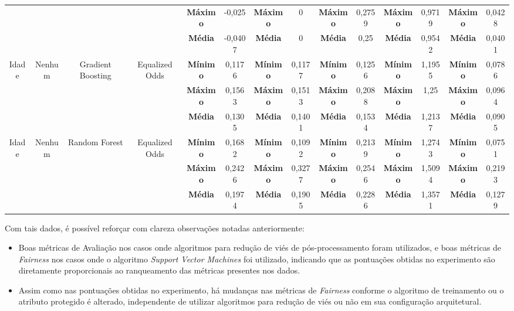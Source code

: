 \documentclass[portugues]{ic-tese}
\begin{document}
\begin{table}[H]
\begin{center}
{\begin{tabular}{c|c|c|c|c|c|c|c|c|c|c|c|c|c}
             & & & & \textbf{Máximo} & -0,025 & \textbf{Máximo} & 0 & \textbf{Máximo} & 0,2759 & \textbf{Máximo} & 0,9719 & \textbf{Máximo} & 0,0428 \\
             & & & & \textbf{Média} & -0,0407 & \textbf{Média} & 0 & \textbf{Média} & 0,25 & \textbf{Média} & 0,9542 & \textbf{Média} & 0,0401 \\
            \hline
            \multirow{3}{*}{Idade} & \multirow{3}{*}{Nenhum} & \multirow{3}{*}{Gradient Boosting} & \multirow{3}{*}{Equalized Odds} & \textbf{Mínimo} & 0,1176 & \textbf{Mínimo} & 0,1177 & \textbf{Mínimo} & 0,1256 & \textbf{Mínimo} & 1,1955 & \textbf{Mínimo} & 0,0786 \\
             & & & & \textbf{Máximo} & 0,1563 & \textbf{Máximo} & 0,1513 & \textbf{Máximo} & 0,2088 & \textbf{Máximo} & 1,25 & \textbf{Máximo} & 0,0964 \\
             & & & & \textbf{Média} & 0,1305 & \textbf{Média} & 0,1401 & \textbf{Média} & 0,1534 & \textbf{Média} & 1,2137 & \textbf{Média} & 0,0905 \\
            \hline
            \multirow{3}{*}{Idade} & \multirow{3}{*}{Nenhum} & \multirow{3}{*}{Random Forest} & \multirow{3}{*}{Equalized Odds} & \textbf{Mínimo} & 0,1682 & \textbf{Mínimo} & 0,1092 & \textbf{Mínimo} & 0,2139 & \textbf{Mínimo} & 1,2743 & \textbf{Mínimo} & 0,0751 \\
             & & & & \textbf{Máximo} & 0,2426 & \textbf{Máximo} & 0,3277 & \textbf{Máximo} & 0,2546 & \textbf{Máximo} & 1,5094 & \textbf{Máximo} & 0,2193 \\
             & & & & \textbf{Média} & 0,1974 & \textbf{Média} & 0,1905 & \textbf{Média} & 0,2286 & \textbf{Média} & 1,3571 & \textbf{Média} & 0,1279 \\
            \end{tabular}}
        \end{center}
    \end{table}

Com tais dados, é possível reforçar com clareza observações notadas anteriormente:

\begin{itemize}
\item Boas métricas de Avaliação nos casos onde algoritmos para redução de viés de pós-processamento foram utilizados, e boas métricas de \textit{Fairness} nos casos onde o algoritmo \textit{Support Vector Machines} foi utilizado, indicando que as pontuações obtidas no experimento são diretamente proporcionais ao ranqueamento das métricas presentes nos dados.
\item Assim como nas pontuações obtidas no experimento, há mudanças nas métricas de \textit{Fairness} conforme o algoritmo de treinamento ou o atributo protegido é alterado, independente de utilizar algoritmos para redução de viés ou não em sua configuração arquitetural.
\end{itemize}
\end{document}
